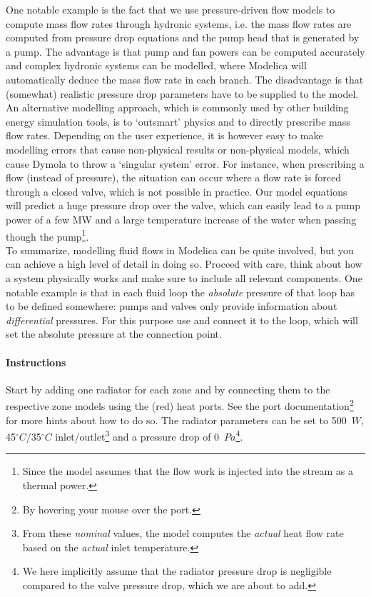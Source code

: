 \documentclass[10pt,a4paper]{article}
\begin{document}
One notable example is the fact that we use pressure-driven flow models 
to compute mass flow rates through hydronic systems, i.e. the mass flow rates are computed from pressure drop equations
and the pump head that is generated by a pump.
The advantage is that 
pump and fan powers can be computed accurately and 
complex hydronic systems can be modelled, 
where Modelica will automatically deduce the mass flow rate in each branch.
The disadvantage is that (somewhat) realistic pressure drop parameters have to be supplied
to the model.
An alternative modelling approach, which is commonly used by other building energy simulation tools, 
is to `outsmart' physics and to directly prescribe mass flow rates.
Depending on the user experience, it is however easy to make modelling errors that cause
non-physical results or non-physical models, which cause Dymola to throw a `singular system' error.
For instance, when prescribing a flow (instead of pressure),
the situation can occur where a flow rate is forced
through a closed valve, which is not possible in practice. 
Our model equations will predict a huge
pressure drop over the valve, which can easily lead to a pump power 
of a few MW and a large
temperature increase of the water when passing though the pump\footnote{Since the model assumes that the flow work 
is injected into the stream as a thermal power.}.\\

To summarize, modelling fluid flows in Modelica can be quite involved,
but you can achieve a high level of detail in doing so.
Proceed with care, think about how a system physically works and make sure to 
include all relevant components.
One notable example is that in each fluid loop the 
\textit{absolute} pressure of that loop has to be defined somewhere: 
pumps and valves only provide information
about \textit{differential} pressures. 
For this purpose use  and connect
it to the loop, which will set the absolute pressure at the connection point.


\paragraph{Instructions}
Start by adding one radiator for each zone and by 
connecting them to the respective zone models using the (red) heat ports.
See the port documentation\footnote{By hovering your mouse over the port.} 
for more hints about how to do so.
The radiator parameters can be set to 500~$W$, 45$^{\circ}C$/35$^{\circ}C$ inlet/outlet\footnote{From these \textit{nominal} values, the model computes the \textit{actual} heat flow rate based on the \textit{actual} inlet temperature.}
and a pressure drop of 0~$Pa$\footnote{We here implicitly assume that the radiator pressure drop is negligible compared to the valve pressure drop, which we are about to add.}.\\
\end{document}
